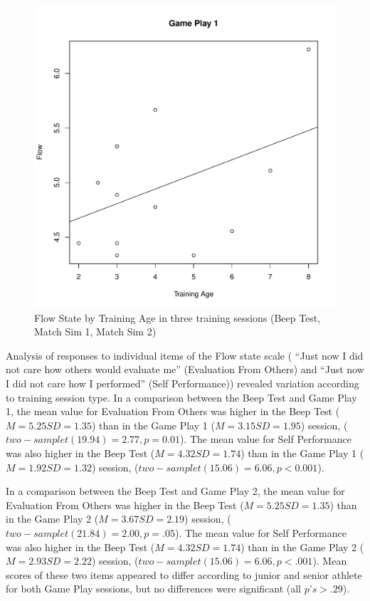\begin{CJK}{UTF8}{gbsn}
\begin{figure}[htbp]
\includegraphics[scale=.2]{images/flow0109TrainingAge.pdf}
  \caption{Flow State by Training Age in three training sessions (Beep Test, Match Sim 1, Match Sim 2)}
  \label{fig:flowTrainingAge}
\end{figure}

Analysis of responses to individual items of the Flow state scale ( ``Just now I did not care how others would evaluate me'' (Evaluation From Others) and  ``Just now I did not care how I performed'' (Self Performance)) revealed variation according to training session type.   In a comparison between the Beep Test and Game Play 1, the mean value for Evaluation From Others was higher in the Beep Test ($M = 5.25 SD = 1.35$) than in the Game Play 1 ($M = 3.15 SD = 1.95$) session, ($two-sample t(19.94) = 2.77, p = 0.01$).   The mean value for Self Performance was also higher in the Beep Test ($M = 4.32 SD = 1.74$) than in the Game Play 1 ($M = 1.92 SD = 1.32$) session, ($two-sample t(15.06) = 6.06, p < 0.001$).

In a comparison between the Beep Test and Game Play 2, the mean value for Evaluation From Others was higher in the Beep Test ($M = 5.25 SD = 1.35$) than in the Game Play 2 ($M = 3.67 SD = 2.19$) session, ($two-sample t(21.84) = 2.00, p = .05$).   The mean value for Self Performance was also higher in the Beep Test ($M = 4.32 SD = 1.74$) than in the Game Play 2 ($M = 2.93 SD = 2.22$) session, ($two-sample t(15.06) = 6.06, p < .001$).  Mean scores of these two items appeared to differ according to junior and senior athlete for both Game Play sessions, but no differences were significant (all $p’s > .29$).


\end{CJK}
